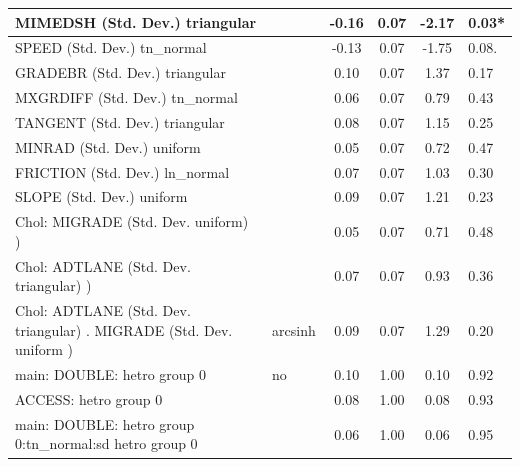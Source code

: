 \begin{table}
\begin{center}
\begin{tabular}{|l|l|c|c|c|l|}
			\hline
			MIMEDSH (Std. Dev.) triangular &  & -0.16 & 0.07 & -2.17 & 0.03* \\
			\hline
			SPEED (Std. Dev.) tn_normal &  & -0.13 & 0.07 & -1.75 & 0.08. \\
			\hline
			GRADEBR (Std. Dev.) triangular &  & 0.10 & 0.07 & 1.37 & 0.17 \\
			\hline
			MXGRDIFF (Std. Dev.) tn_normal &  & 0.06 & 0.07 & 0.79 & 0.43 \\
			\hline
			TANGENT (Std. Dev.) triangular &  & 0.08 & 0.07 & 1.15 & 0.25 \\
			\hline
			MINRAD (Std. Dev.) uniform &  & 0.05 & 0.07 & 0.72 & 0.47 \\
			\hline
			FRICTION (Std. Dev.) ln_normal &  & 0.07 & 0.07 & 1.03 & 0.30 \\
			\hline
			SLOPE (Std. Dev.) uniform &  & 0.09 & 0.07 & 1.21 & 0.23 \\
			\hline
			 Chol: MIGRADE (Std. Dev. uniform) ) &  & 0.05 & 0.07 & 0.71 & 0.48 \\
			\hline
			 Chol: ADTLANE (Std. Dev. triangular) ) &  & 0.07 & 0.07 & 0.93 & 0.36 \\
			\hline
			 Chol: ADTLANE (Std. Dev. triangular) . MIGRADE (Std. Dev.   uniform ) & arcsinh & 0.09 & 0.07 & 1.29 & 0.20 \\
			\hline
			main: DOUBLE: hetro group 0 & no & 0.10 & 1.00 & 0.10 & 0.92 \\
			\hline
			ACCESS: hetro group 0 &  & 0.08 & 1.00 & 0.08 & 0.93 \\
			\hline
			main: DOUBLE: hetro group 0:tn_normal:sd  hetro group 0 &  & 0.06 & 1.00 & 0.06 & 0.95 \\
			\hline
		\end{tabular}
	\end{center}
\end{table}